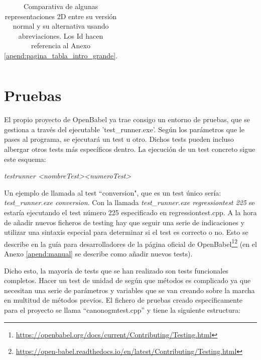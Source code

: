 \begin{table}[h!]
\begin{tabular}{c>{\centering}m{5cm}>{\centering\arraybackslash}m{5.9cm}}
        \bottomrule
        \end{tabular}
    \caption{Comparativa de algunas representaciones 2D entre su versión normal y su alternativa usando abreviaciones. Los Id hacen referencia al Anexo \ref{apend:pagina_tabla_intro_grande}.}
    \label{tab:alias_vs_no_alias}
\end{table}



\newpage



\section{Pruebas} \label{pruebas}
El propio proyecto de OpenBabel ya trae consigo un entorno de pruebas, que se gestiona a través del ejecutable 'test\_runner.exe'. Según los parámetros que le pases al programa, se ejecutará un test u otro. Dichos tests pueden incluso albergar otros tests más específicos dentro. La ejecución de un test concreto sigue este esquema: 
\begin{center}
    \textit{test\textunderscore runner \textless nombreTest\textgreater  \textless numeroTest\textgreater}    
\end{center}

Un ejemplo de llamada al test ``conversion", que es un test único sería: \textit{test\_runner.exe conversion}. Con la llamada \textit{test\_runner.exe regressiontest 225} se estaría ejecutando el test número 225 especificado en regressiontest.cpp. A la hora de añadir nuevos ficheros de testing hay que seguir una serie de indicaciones y utilizar una sintaxis especial para determinar si el test es correcto o no. Esto se describe en la guía para desarrolladores de la página oficial de OpenBabel\footnote{\url{https://openbabel.org/docs/current/Contributing/Testing.html}}\footnotecomma\footnote{\url{https://open-babel.readthedocs.io/en/latest/Contributing/Testing.html}} (en el Anexo \ref{apend:manual} se describe como añadir nuevos tests).

Dicho esto, la mayoría de tests que se han realizado son tests funcionales completos. Hacer un test de unidad de según que métodos es complicado ya que necesitan una serie de parámetros y variables que se van creando sobre la marcha en multitud de métodos previos. El fichero de pruebas creado específicamente para el proyecto se llama ``canonogmtest.cpp'' y tiene la siguiente estructura:
\vspace{0.2cm}

